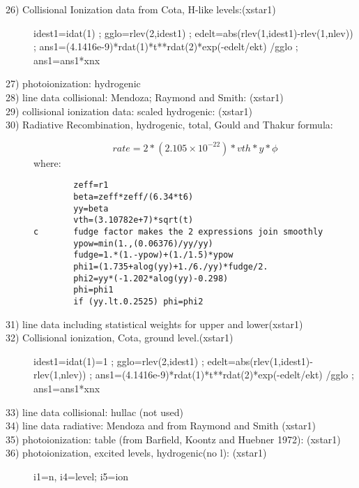 \begin{description}
\item[26) Collisional Ionization data from Cota, H-like levels:(xstar1)]
 idest1=idat(1)
; gglo=rlev(2,idest1)
; edelt=abs(rlev(1,idest1)-rlev(1,nlev))
; ans1=(4.1416e-9)*rdat(1)*t**rdat(2)*exp(-edelt/ekt)
            /gglo
; ans1=ans1*xnx


\item[27) photoionization: hydrogenic]
 

\item[28) line data collisional: Mendoza; Raymond and Smith: (xstar1) ]
 

\item[29) collisional ionization data: scaled hydrogenic: (xstar1) ]
 

\item[30) Radiative Recombination, hydrogenic, total, Gould and Thakur formula:]
 $$rate=2*(2.105 \times 10^{-22})*vth*y*\phi$$
 where:
\begin{verbatim}
        zeff=r1
        beta=zeff*zeff/(6.34*t6)
        yy=beta
        vth=(3.10782e+7)*sqrt(t)
c       fudge factor makes the 2 expressions join smoothly
        ypow=min(1.,(0.06376)/yy/yy)
        fudge=1.*(1.-ypow)+(1./1.5)*ypow
        phi1=(1.735+alog(yy)+1./6./yy)*fudge/2.
        phi2=yy*(-1.202*alog(yy)-0.298)
        phi=phi1
        if (yy.lt.0.2525) phi=phi2
\end{verbatim}

\item[31) line data including statistical weights for upper and lower(xstar1)]
 

\item[32) Collisional ionization, Cota, ground level.(xstar1)]
 idest1=idat(1)=1
; gglo=rlev(2,idest1)
; edelt=abs(rlev(1,idest1)-rlev(1,nlev))
; ans1=(4.1416e-9)*rdat(1)*t**rdat(2)*exp(-edelt/ekt)
             /gglo
; ans1=ans1*xnx

\item[33) line data collisional: hullac (not used)          ]
 

\item[34) line data radiative: Mendoza and from Raymond and Smith (xstar1) ]
 

\item[35) photoionization: table (from Barfield, Koontz and Huebner 1972):
(xstar1) ]
 

\item[36) photoionization, excited levels, hydrogenic(no l): (xstar1) ]

i1=n, i4=level; i5=ion
 

\end{description}
